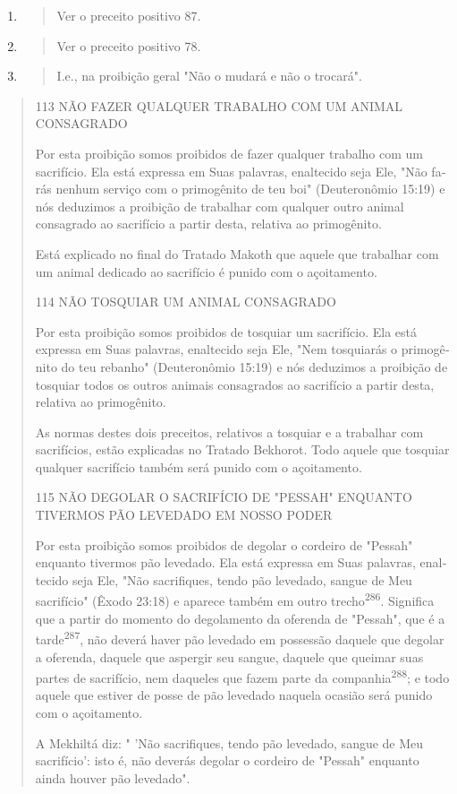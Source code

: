 \begin{enumerate}
\def\labelenumi{\arabic{enumi}.}
\setcounter{enumi}{277}
\item
  \begin{quote}
  Ver o preceito positivo 87.
  \end{quote}
\item
  \begin{quote}
  Ver o preceito positivo 78.
  \end{quote}
\item
  \begin{quote}
  I.e., na proibição geral "Não o mudará e não o trocará".
  \end{quote}
\end{enumerate}

\begin{quote}

113 NÃO FAZER QUALQUER TRABALHO COM UM ANIMAL CONSAGRADO

Por esta proibição somos proibidos de fazer qualquer trabalho com um
sacrifício. Ela está expressa em Suas palavras, enaltecido seja Ele,
"Não fa­rás nenhum serviço com o primogênito de teu boi" (Deuteronômio
15:19) e nós deduzimos a proibição de trabalhar com qualquer outro
animal consagra­do ao sacrifício a partir desta, relativa ao
primogênito.

Está explicado no final do Tratado Makoth que aquele que trabalhar com
um animal dedicado ao sacrifício é punido com o açoitamento.

114 NÃO TOSQUIAR UM ANIMAL CONSAGRADO

Por esta proibição somos proibidos de tosquiar um sacrifício. Ela es­tá
expressa em Suas palavras, enaltecido seja Ele, "Nem tosquiarás o
primogê­nito do teu rebanho" (Deuteronômio 15:19) e nós deduzimos a
proibição de tosquiar todos os outros animais consagrados ao sacrifício
a partir desta, relati­va ao primogênito.

As normas destes dois preceitos, relativos a tosquiar e a trabalhar com
sacrifícios, estão explicadas no Tratado Bekhorot. Todo aquele que
tosquiar qualquer sacrifício também será punido com o açoitamento.

115 NÃO DEGOLAR O SACRIFÍCIO DE "PESSAH" ENQUANTO TIVERMOS PÃO LEVEDADO
EM NOSSO PODER

Por esta proibição somos proibidos de degolar o cordeiro de "Pes­sah"
enquanto tivermos pão levedado. Ela está expressa em Suas palavras,
enal­tecido seja Ele, "Não sacrifiques, tendo pão levedado, sangue de
Meu sacrifí­cio" (Êxodo 23:18) e aparece também em outro
trecho\textsuperscript{286}. Significa que a par­tir do momento do
degolamento da oferenda de "Pessah", que é a tarde\textsuperscript{287},
não deverá haver pão levedado em possessão daquele que degolar a
oferenda, daquele que aspergir seu sangue, daquele que queimar suas
partes de sacrifício, nem daqueles que fazem parte da
companhia\textsuperscript{288}; e todo aquele que estiver de posse de
pão levedado naquela ocasião será punido com o açoitamento.

A Mekhiltá diz: " 'Não sacrifiques, tendo pão levedado, sangue de Meu
sacrifício': isto é, não deverás degolar o cordeiro de "Pessah" enquanto
ainda houver pão levedado".
\end{quote}

